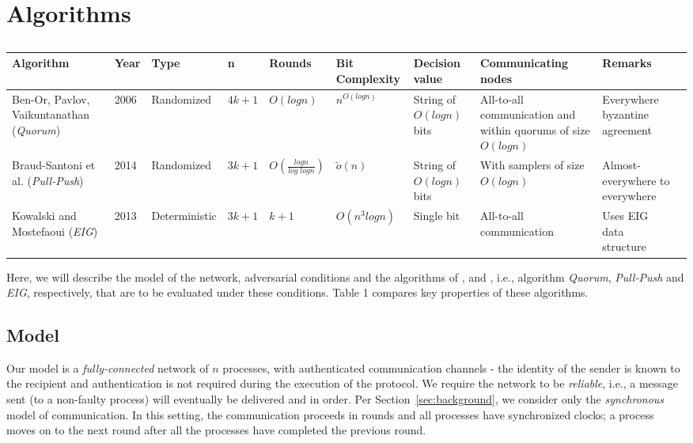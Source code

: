 ﻿\section{Algorithms}
\label{sec:algos}

\begin{table*}[t]
    \caption{}
    \begin{tabular}{p{2cm}lllp{1.5cm}p{1.5cm}p{1.5cm}p{1.5cm}p{1.5cm}p{1.5cm}}
\hline
\textbf{Algorithm} & \textbf{Year} & \textbf{Type} &\textbf{n} & \textbf{Rounds} & \textbf{Bit Complexity } &\textbf{Decision value} & \textbf{Commun\-icating nodes}& \textbf{Remarks} \\ \hline
Ben-Or, Pavlov, Vaikuntanathan \cite{BPV06} (\textit{Quorum})& 2006 & Randomized & $4k + 1$ & $O(logn)$ & $n^{O(logn)}$      &String of $O(logn)$ bits &All-to-all communication and within quorums of size $O(logn)$   & Everywhere byzantine agreement     \\
          Braud-Santoni et al. \cite{BGH13} (\textit{Pull-Push}) & 2014 & Randomized & $3k + 1$ & $O(\frac{logn}{log\; log n})$ & $\tilde{o}(n)$      &String of $O(logn)$ bits &With samplers of size $O(logn)$  & Almost-everywhere to everywhere     \\
                Kowalski and Mostefaoui \cite{KM13} (\textit{EIG}) & 2013   & Deterministic & $3k + 1$     & $k + 1$                     & $O(n^3logn)$ &Single bit  &All-to-all communication & Uses EIG data structure\\ \hline
%
\end{tabular}
\end{table*}

Here, we will describe the model of the network, adversarial conditions and the algorithms of \cite{BPV06}, \cite{BGH13} and \cite{KM13}, i.e., algorithm \textit{Quorum}, \textit{Pull-Push} and \textit{EIG}, respectively, that are to be evaluated under these conditions. Table 1 compares key properties of these algorithms.


\subsection{Model}
Our model is a \textit{fully-connected} network of $n$ processes, with authenticated communication channels - the identity of the sender is known to the recipient and authentication is not required during the execution of the protocol. We require the network to be \textit{reliable}, i.e., a message sent (to a non-faulty process) will eventually be delivered and in order. Per Section~\ref{sec:background}, we consider only the \textit{synchronous} model of communication. In this setting, the communication proceeds in rounds and all processes have synchronized clocks; a process moves on to the next round after all the processes have completed the previous round. %

